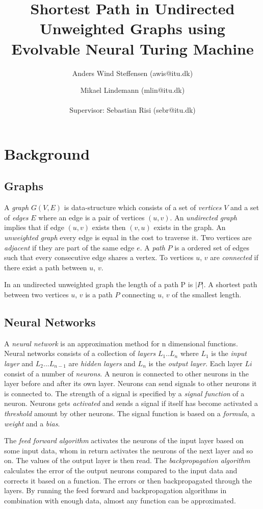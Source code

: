 \documentclass{article}
\author{Anders Wind Steffensen (awis@itu.dk)\and Mikael Lindemann (mlin@itu.dk)\\\\Supervisor: Sebastian Risi (sebr@itu.dk)}
\title{Shortest Path in Undirected Unweighted Graphs using Evolvable Neural Turing Machine}
\begin{document}
\maketitle
\tableofcontents
\newpage
\section{Background}
\subsection{Graphs}
A \textit{graph} $G(V,E)$ is data-structure which consists of a set of \textit{vertices} $V$ and a set of \textit{edges} $E$ where an edge is a pair of vertices $(u,v)$. An \textit{undirected graph} implies that if edge $ (u,v) $ exists then $ (v,u) $ exists in the graph. An \textit{unweighted graph} every edge is equal in the cost to traverse it. 
Two vertices are \textit{adjacent} if they are part of the same edge $ e $. A \textit{path} $ P $ is a ordered set of edges such that every consecutive edge shares a vertex. To vertices $ u $, $ v $ are \textit{connected} if there exist a path between $ u $, $ v $.

In an undirected unweighted graph the length of a path P is $ |P| $. A shortest path between two vertices  $ u $, $ v $ is a path $ P $ connecting  $ u $, $ v $ of the smallest length. 

\subsection{Neural Networks}
A \textit{neural network} is an approximation method for n dimensional functions. Neural networks consists of a collection of \textit{layers} $ L_1 .. L_n $ where $ L_1 $ is the \textit{input layer} and $ L_2 ... L_{n-1} $ are \textit{hidden layers} and $ L_n $ is the \textit{output layer}. Each layer $ Li $ consist of a number of \textit{neurons}. A neuron is connected to other neurons in the layer before and after its own layer. Neurons can send signals to other neurons it is connected to. The strength of a signal is specified by a \textit{signal function} of a neuron. Neurons gets \textit{activated} and sends a signal if itself has become activated a \textit{threshold} amount by other neurons. The signal function is based on a \textit{formula}, a \textit{weight} and a \textit{bias}. 

The \textit{feed forward algorithm} activates the neurons of the input layer based on some input data, whom in return activates the neurons of the next layer and so on. The values of the output layer is then read. The \textit{backpropagation algorithm} calculates the error of the output neurons compared to the input data and corrects it based on a function. The errors or then backpropagated through the layers. By running the feed forward and backpropagation algorithms in combination with enough data, almost any function can be approximated.
\end{document}
